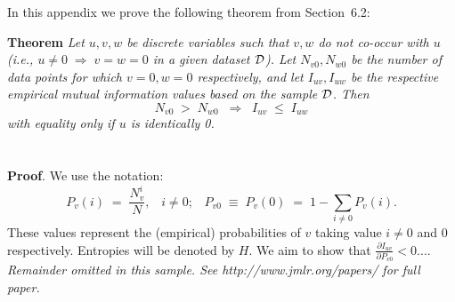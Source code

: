\documentclass[twoside,11pt]{article}
\newcommand{\dataset}{{\cal D}}
\newcommand{\fracpartial}[2]{\frac{\partial #1}{\partial  #2}}
\begin{document}

In this appendix we prove the following theorem from
Section~6.2:

\noindent
{\bf Theorem} {\it Let $u,v,w$ be discrete variables such that $v, w$ do
not co-occur with $u$ (i.e., $u\neq0\;\Rightarrow \;v=w=0$ in a given
dataset $\dataset$). Let $N_{v0},N_{w0}$ be the number of data points for
which $v=0, w=0$ respectively, and let $I_{uv},I_{uw}$ be the
respective empirical mutual information values based on the sample
$\dataset$. Then
\[
	N_{v0} \;>\; N_{w0}\;\;\Rightarrow\;\;I_{uv} \;\leq\;I_{uw}
\]
with equality only if $u$ is identically 0.} \hfill\BlackBox

\section{}

\noindent
{\bf Proof}. We use the notation:
\[
P_v(i) \;=\;\frac{N_v^i}{N},\;\;\;i \neq 0;\;\;\;
P_{v0}\;\equiv\;P_v(0)\; = \;1 - \sum_{i\neq 0}P_v(i).
\]
These values represent the (empirical) probabilities of $v$
taking value $i\neq 0$ and 0 respectively.  Entropies will be denoted
by $H$. We aim to show that $\fracpartial{I_{uv}}{P_{v0}} < 0$....\\

{\noindent \em Remainder omitted in this sample. See http://www.jmlr.org/papers/ for full paper.}


\vskip 0.2in

\end{document}
